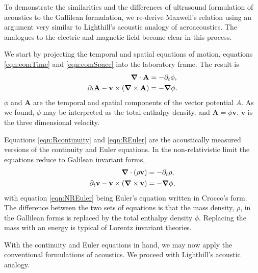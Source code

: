 \documentclass[10pt, fleqn,final,showtrims,oldfontcommands]{article} %
\newcommand{\sub}[1]{\begin{subequations}#1\end{subequations}}
\newcommand{\eqa}[1]{\begin{align}#1\end{align}}
\newcommand{\eqnref}[1]{\ref{eqn:#1}}
\newcommand{\lr}[1]{\left( #1 \right)}
\renewcommand{\d}{\partial}
\newcommand{\del}{\nabla}
\newcommand{\vdel}{ \mbox{\boldmath $\del$}}
\newcommand{\dt}{{\d_t}}
\newcommand{\g}{\gamma_0}
\newcommand{\vA}{\textbf{A}}
\newcommand{\vv}{\textbf{v}}
\begin{document}
To demonstrate the similarities and the differences of ultrasound formulation of acoustics  to the Gallilean formulation,
we re-derive Maxwell's relation using an argument very similar to Lighthill's acoustic analogy\cite{Lighthill1952} of aeroacoustics.
The analogues to the electric and magnetic field  become clear in this process.

We start  by projecting the temporal and spatial equations of motion, equations \eqnref{eomTime} and \eqnref{eomSpace}
into the laboratory frame.
The result is
\sub{
  \begin{align}
     \vdel \cdot \vA &=  - \dt \phi, \label{eqn:Rcontinuity}\\ %
\dt \vA - \vv \times  \lr{\vdel \times \vA} \label{eqn:REuler}
&= - \vdel \phi.
  \end{align}
}
$\phi$ and $\vA$ are the temporal and spatial components of the vector potential $A$.
As we found, $\phi$ may be interpreted as the total enthalpy density,
and $\vA = \phi \vv$.
$\vv$ is the three dimensional velocity.

Equations \eqnref{Rcontinuity} and \eqnref{REuler} are the acoustically measured versions of the continuity and Euler equations.
In the non-relativistic limit the equations reduce to Galilean invariant forms, 
\sub{
\begin{align}
  \vdel\cdot\lr{\rho \vv}  &= -\dt \rho, \label{eqn:NRcontinuity}\\
  \dt \vv - \vv\times \lr{\vdel\times \vv} &= - \vdel \phi,\label{eqn:NREuler}
\end{align}
}
with 
equation \eqnref{NREuler} being Euler's equation written in Crocco's form\cite{Howe1998}.
The difference between the two sets of equations is that the mass density, $\rho$, in the Gallilean forms is
replaced by the total enthalpy density $\phi$. 
Replacing the mass with an energy is typical of Lorentz invariant theories.

With the continuity and Euler equations in hand,
we may now apply the conventional formulations of acoustics.
We proceed with Lighthill's acoustic analogy\cite{Lighthill1952, Howe1998}.
\end{document}
